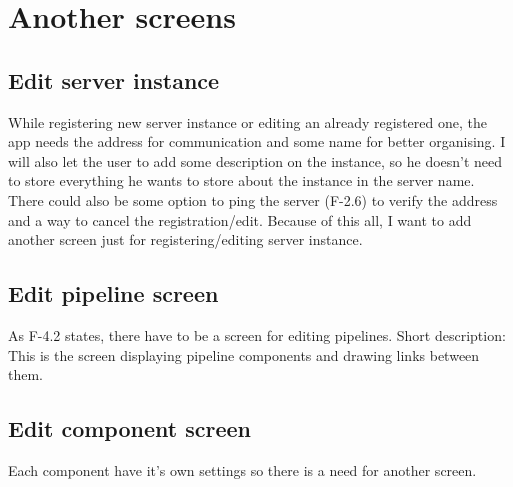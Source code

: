 \section{Another screens}

\subsection{Edit server instance}
While registering new server instance or editing an already registered one, the app needs the address for communication and some name for better organising. I will also let the user to add some description on the instance, so he doesn't need to store everything he wants to store about the instance in the server name. There could also be some option to ping the server (F-2.6) to verify the address and a way to cancel the registration/edit.
Because of this all, I want to add another screen just for registering/editing server instance.

\subsection{Edit pipeline screen}
As F-4.2 states, there have to be a screen for editing pipelines. Short description: This is the screen displaying pipeline components and drawing links between them.

\subsection{Edit component screen}
Each component have it's own settings so there is a need for another screen.